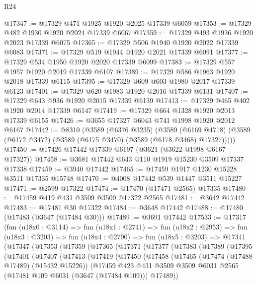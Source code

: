\begin{lexlean}{R24}
\begin{coremodule}
@17347 := @17329 @471 @1925 @1920 @2025 @17339 @6059
@17353 := @17329 @482 @1930 @1920 @2024 @17339 @6067
@17359 := @17329 @493 @1936 @1920 @2023 @17339 @6075
@17365 := @17329 @506 @1940 @1920 @2022 @17339 @6083
@17371 := @17329 @519 @1944 @1920 @2021 @17339 @6091
@17377 := @17329 @534 @1950 @1920 @2020 @17339 @6099
@17383 := @17329 @557 @1957 @1920 @2019 @17339 @6107
@17389 := @17329 @586 @1963 @1920 @2018 @17339 @6115
@17395 := @17329 @609 @603 @1980 @2017 @17339 @6123
@17401 := @17329 @620 @1983 @1920 @2016 @17339 @6131
@17407 := @17329 @643 @936 @1920 @2015 @17339 @6139
@17413 := @17329 @465 @402 @1920 @2014 @17339 @6147
@17419 := @17329 @664 @1328 @1920 @2013 @17339 @6155
@17426 := @3655 @17327 @6043 @741 @1998 @1920 @2012 @6167
@17442 := @8310
    (@3589
      (@6376 @3235)
      (@3589
        (@6169 @4718)
        (@3589 (@6172 @3472) (@3589 (@6175 @3470) (@3589 (@6178 @3468) @17327)))))
@17450 := @17426 @17442 @17339 @6197 (@3621 (@3622 @1998 @6167 @17327))
@17458 := @3681 @17442 @643 @110 @1919 @15230 @3509 @17337 @17338
@17459 := @3940 @17442
@17465 := @17459 @1917 @1230 @15228 @3511 @17335 @15748
@17470 := @4008 @17442 @539 @1447 @3511 @15227
@17471 := @2599 @17322
@17474 := @17470 (@17471 @2565) @17335
@17480 := @17459 @419 @431 @3509 @3509 @17322 @2565
@17481 := @3642 @17442
@17483 := @17481 @30 @17322
@17484 := @3648 @17442
@17488 := @17480 (@17483 (@3647 (@17484 @30)))
@17489 := @3691 @17442
@17533 := @17317
    (fun (u18x0 : @3114) =>
    fun (u18x1 : @2741) =>
    fun (u18x2 : @2953) =>
    fun (u18x3 : @3203) =>
    fun (u18x4 : @2790) =>
    fun (u18x5 : @3203) =>
    @17341
      (@17347
        (@17353
          (@17359
            (@17365
              (@17371
                (@17377
                  (@17383
                    (@17389
                      (@17395
                        (@17401
                          (@17407
                            (@17413
                              (@17419
                                (@17450
                                  (@17458
                                    (@17465
                                      (@17474 (@17488 @17489) (@15432 @15226))
                                      (@17459
                                        @423
                                        @431
                                        @3509
                                        @3509
                                        @6031
                                        @2565
                                        (@17481 @109 @6031 (@3647 (@17484 @109)))
                                        @17489))

\end{coremodule}
\end{lexlean}
